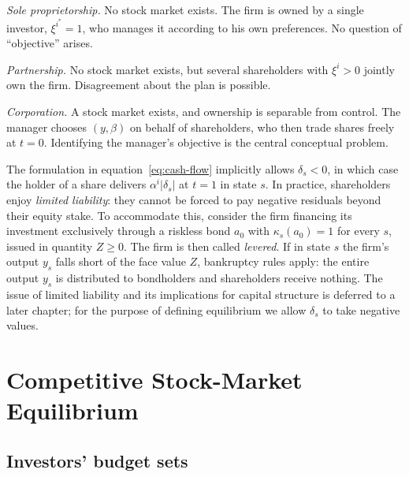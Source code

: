 \documentclass[11pt,a4paper,oneside]{book}
\def\geq{\geqslant}
\theoremstyle{plain}
\theoremstyle{definition}
\theoremstyle{remark}
\numberwithin{equation}{chapter}
\begin{document}
\emph{Sole proprietorship.}
No stock market exists.
The firm is owned by a single investor, $\xi^{i^\ast} = 1$, who manages it according to his own preferences.
No question of ``objective'' arises.

\emph{Partnership.}
No stock market exists, but several shareholders with $\xi^i > 0$ jointly own the firm.
Disagreement about the plan is possible.

\emph{Corporation.}
A stock market exists, and ownership is separable from control.
The manager chooses $(y, \beta)$ on behalf of shareholders, who then trade shares freely at $t=0$.
Identifying the manager's objective is the central conceptual problem.

The formulation in equation~\eqref{eq:cash-flow} implicitly allows $\delta_s < 0$, in which case the holder of a share delivers $\alpha^i |\delta_s|$ at $t=1$ in state $s$.
In practice, shareholders enjoy \emph{limited liability}: they cannot be forced to pay negative residuals beyond their equity stake.
To accommodate this, consider the firm financing its investment exclusively through a riskless bond $a_0$ with $\kappa_s(a_0) = 1$ for every $s$, issued in quantity $Z \geq 0$.
The firm is then called \emph{levered}.
If in state $s$ the firm's output $y_s$ falls short of the face value $Z$, bankruptcy rules apply: the entire output $y_s$ is distributed to bondholders and shareholders receive nothing.
The issue of limited liability and its implications for capital structure is deferred to a later chapter; for the purpose of defining equilibrium we allow $\delta_s$ to take negative values.

\section{Competitive Stock-Market Equilibrium}
\label{sec:equilibrium}

\subsection{Investors' budget sets}
\end{document}
